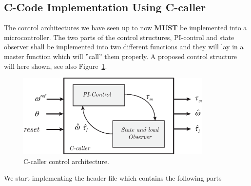 \documentclass[11pt,a4paper,oneside]{book}
\numberwithin{equation}{section}
\theoremstyle{it}
\theoremstyle{definition}
\begin{document}
	
	\subsection{C-Code Implementation Using C-caller} 
	The control architectures we have seen up to now \textbf{MUST} be implemented into a microcontroller. The two parts of the control structures, PI-control and state observer shall be implemented 
	into two different functions and they will lay in a master function which will 
	''call'' them properly. A proposed control structure will here shown, see also 
	Figure~\ref{ccaller_ctrl_1}.
	\begin{figure}[H]
		\centering
		\includegraphics[width = 275pt, angle=0, 
		keepaspectratio]{figures/ccaller/ccaller_structure_1.eps}
		\captionsetup{width=0.5\textwidth, font=small}		
		\caption{C-caller control architecture.}
		\label{ccaller_ctrl_1}
	\end{figure}
	We start implementing the header file which contains the following parts
\end{document}
